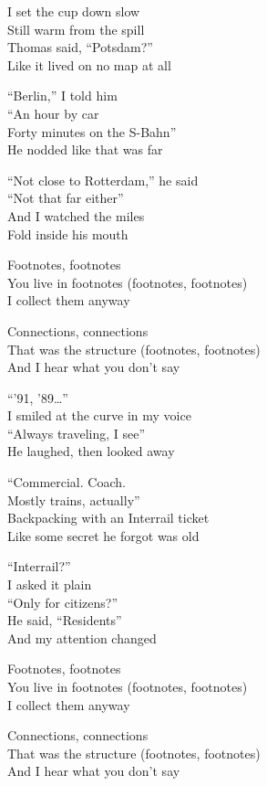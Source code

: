 \begin{lyrics}
I set the cup down slow\\
Still warm from the spill\\
Thomas said, “Potsdam?”\\
Like it lived on no map at all

“Berlin,” I told him\\
“An hour by car\\
Forty minutes on the S-Bahn”\\
He nodded like that was far

“Not close to Rotterdam,” he said\\
“Not that far either”\\
And I watched the miles\\
Fold inside his mouth

Footnotes, footnotes\\
You live in footnotes
(footnotes, footnotes)\\
I collect them anyway

Connections, connections\\
That was the structure
(footnotes, footnotes)\\
And I hear what you don’t say

“’91, ’89…”\\
I smiled at the curve in my voice\\
“Always traveling, I see”\\
He laughed, then looked away

“Commercial. Coach.\\
Mostly trains, actually”\\
Backpacking with an Interrail ticket\\
Like some secret he forgot was old

“Interrail?”\\
I asked it plain\\
“Only for citizens?”\\
He said, “Residents”\\
And my attention changed

Footnotes, footnotes\\
You live in footnotes
(footnotes, footnotes)\\
I collect them anyway

Connections, connections\\
That was the structure
(footnotes, footnotes)\\
And I hear what you don’t say


\end{lyrics}
